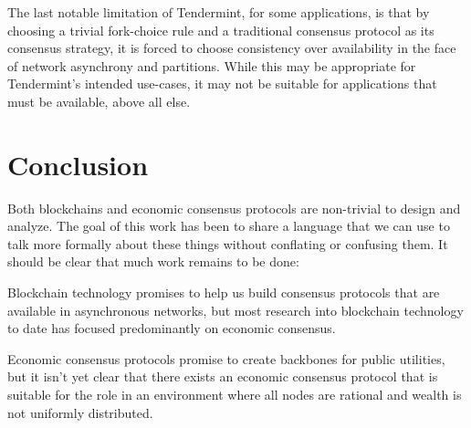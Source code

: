 \documentclass[11pt,a4paper]{article}
\theoremstyle{plain}
\theoremstyle{definition}
\begin{document}
The last notable limitation of Tendermint, for some applications, is that by choosing a trivial fork-choice rule and a traditional consensus protocol as its consensus strategy, it is forced to choose consistency over availability in the face of network asynchrony and partitions. While this may be appropriate for Tendermint's intended use-cases, it may not be suitable for applications that must be available, above all else. 


\section{Conclusion}

Both blockchains and economic consensus protocols are non-trivial to design and analyze. The goal of this work has been to share a language that we can use to talk more formally about these things without conflating or confusing them. It should be clear that much work remains to be done: 

Blockchain technology promises to help us build consensus protocols that are available in asynchronous networks, but most research into blockchain technology to date has focused predominantly on economic consensus.

Economic consensus protocols promise to create backbones for public utilities, but it isn't yet clear that there exists an economic consensus protocol that is suitable for the role in an environment where all nodes are rational and wealth is not uniformly distributed.

\pagebreak


\end{document}
